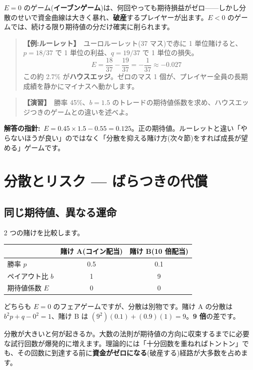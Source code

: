\documentclass{article}
\begin{document}
\(E = 0\) のゲーム(\textbf{イーブンゲーム})は、何回やっても期待損益がゼロ——しかし分散のせいで資金曲線は大きく暴れ、\textbf{破産}するプレイヤーが出ます。\(E < 0\) のゲームでは、続ける限り期待値の分だけ確実に削られます。

\begin{quote}
\textbf{【例:ルーレット】}\ ユーロルーレット(37 マス)で赤に 1 単位賭けると、\(p = 18/37\) で 1 単位の利益、\(q = 19/37\) で 1 単位の損失。
\[ E = \frac{18}{37} - \frac{19}{37} = -\frac{1}{37} \approx -0.027 \]
この約 2.7\% が\textbf{ハウスエッジ}。ゼロのマス 1 個が、プレイヤー全員の長期成績を静かにマイナスへ動かします。
\end{quote}

\begin{quote}
\textbf{【演習】}\ 勝率 45\%、\(b = 1.5\) のトレードの期待値係数を求め、ハウスエッジつきのゲームとの違いを述べよ。
\end{quote}

\textbf{解答の指針:}\ \(E = 0.45 \times 1.5 - 0.55 = 0.125\)。正の期待値。ルーレットと違い「やらないほうが良い」のではなく「分散を抑える賭け方(次々節)をすれば成長が望める」ゲームです。

\section{分散とリスク — ばらつきの代償}

\subsection{同じ期待値、異なる運命}

2 つの賭けを比較します。

\begin{center}
\begin{tabular}{|l|c|c|}
\hline
 & 賭け A(コイン配当) & 賭け B(10 倍配当) \\
\hline
勝率 \(p\) & 0.5 & 0.1 \\
ペイアウト比 \(b\) & 1 & 9 \\
期待値係数 \(E\) & 0 & 0 \\
\hline
\end{tabular}
\end{center}

どちらも \(E = 0\) のフェアゲームですが、分散は別物です。賭け A の分散は \(b^2 p + q - 0^2 = 1\)、賭け B は \((9^2)(0.1) + (0.9)(1) = 9\)。\textbf{9 倍}の差です。

分散が大きいと何が起きるか。大数の法則が期待値の方向に収束するまでに必要な試行回数が爆発的に増えます。理論的には「十分回数を重ねればトントン」でも、その回数に到達する前に\textbf{資金がゼロになる}(破産する)経路が大多数を占めます。
\end{document}
